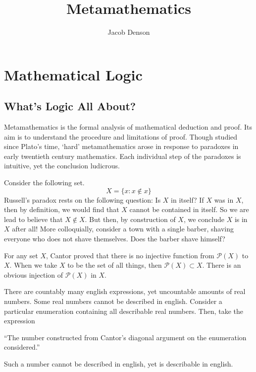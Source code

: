 

\title{Metamathematics}
\author{Jacob Denson}



\maketitle
\tableofcontents

\part{Mathematical Logic}

\chapter{What's Logic All About?}


Metamathematics is the formal analysis of mathematical deduction and proof. Its aim is to understand the procedure and limitations of proof. Though studied since Plato's time, `hard' metamathematics arose in response to paradoxes in early twentieth century mathematics. Each individual step of the paradoxes is intuitive, yet the conclusion ludicrous.

\begin{example}[Russell]
    Consider the following set.
    \[ X = \{ x: x \not \in x \} \]
    Russell's paradox rests on the following question: Is $X$ in itself? If $X$ was in $X$, then by definition, we would find that $X$ cannot be contained in itself. So we are lead to believe that $X \not \in X$. But then, by construction of $X$, we conclude $X$ is in $X$ after all! More colloquially, consider a town with a single barber, shaving everyone who does not shave themselves. Does the barber shave himself?
\end{example}

\begin{example}[Cantor]
    For any set $X$, Cantor proved that there is no injective function from $\mathcal{P}(X)$ to $X$. When we take $X$ to be the set of all things, then $\mathcal{P}(X) \subset X$. There is an obvious injection of $\mathcal{P}(X)$ in $X$.
\end{example}

\begin{example}[Richard]
    There are countably many english expressions, yet uncountable amounts of real numbers. Some real numbers cannot be described in english. Consider a particular enumeration containing all describable real numbers. Then, take the expression
    \begin{displayquote}
        ``The number constructed from Cantor's diagonal argument on the enumeration considered.''
    \end{displayquote}
    Such a number cannot be described in english, yet is describable in english.
\end{example}

